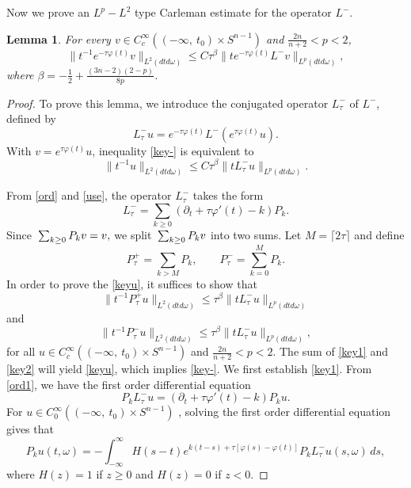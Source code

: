 \documentclass[11pt]{amsart}
\theoremstyle{plain}
\newtheorem{lemma}{Lemma}
\numberwithin{equation}{section}
\begin{document}
Now we prove an $L^p-L^2$ type Carleman estimate for the operator $L^-$.

\begin{lemma}
For every $v \in C^{\infty}_c{\left( {(-\infty, \ t_0)\times S^{n-1}} \right) }$ and $\frac{2n}{n+2}< p < 2$,
\begin{equation}
\|t^{-{1}} e^{-\tau \varphi(t)} v\|_{L^2(dtd\omega)} \leq C
\tau^\beta \|t e^{-\tau \varphi(t)} L^- v\|_{L^p(dtd\omega)},
\label{key-}
\end{equation}
where ${\beta} = - \frac 1 2 + \frac{{\left( {3n-2} \right) }{\left( {2-p} \right) }}{8p}$.
\label{CarL-p}
\end{lemma}

\begin{proof}
To prove this lemma, we introduce the conjugated operator $L^-_\tau$ of $L^-$, defined by
$$L^-_\tau u=e^{-\tau\varphi(t)}L^-(e^{\tau \varphi(t)}u).$$
With $v=e^{\tau \varphi(t)}u$, inequality \eqref{key-} is equivalent to
\begin{equation}
\|t^{-{1}}u \|_{L^2(dtd\omega)}\leq C \tau^\beta \|t L^-_\tau
u\|_{L^p(dtd\omega)}. \label{keyu}
\end{equation}

From \eqref{ord} and \eqref{use}, the operator $L^-_\tau$ takes the form
\begin{equation}
L^-_\tau=\sum_{k\geq 0} (\partial_t+\tau \varphi'(t)-k)P_k.
\label{ord1}
\end{equation}
Since ${\displaystyle} \sum_{k\geq 0} P_k v= v,$ we split ${\displaystyle} \sum_{k \ge 0} P_k v$ into two sums.
Let $M=\lceil 2\tau\rceil$ and define
$$ P^+_\tau=\sum_{k> M}P_k, \quad \quad  P^-_\tau=\sum_{k=0}^{M}P_k.      $$
In order to prove the \eqref{keyu}, it suffices to show that
\begin{equation}
\| t^{-1} P^+_\tau {u} \|_{L^2(dtd\omega)} \leq \tau^{\beta}\|
t{L_\tau^- u} \|_{L^{{p}}(dtd\omega)}
\label{key1}
\end{equation}
and
\begin{equation}
\| t^{-1} P^-_\tau {u}\|_{L^2(dtd\omega)}\leq \tau^\beta\| t
{L_\tau^- u} \|_{L^{{p}}(dtd\omega)},
\label{key2}
\end{equation}
for all $u \in C^{\infty}_c{\left( {(-\infty, \ t_0)\times S^{n-1}} \right) }$ and $\frac{2n}{n+2}< p < 2$.
The sum of \eqref{key1} and \eqref{key2} will yield \eqref{keyu}, which implies \eqref{key-}.
We first establish \eqref{key1}.
From \eqref{ord1}, we have the first order differential equation
\begin{equation}
P_k L^-_\tau u= (\partial_t+\tau \varphi'(t)-k)P_k u.
\label{sord}
\end{equation}
For $u\in C^\infty_{0}{\left( { (-\infty, \ t_0)\times S^{n-1}} \right) }$
, solving the first order differential equation gives that
\begin{equation}
P_k u(t, \omega)
=-\int_{-\infty}^{\infty} H(s-t)e^{k(t-s)+\tau{\left[{\varphi(s)-\varphi(t)}\right]}} P_k L^-_\tau u (s, \omega)\, ds,
\label{star}
\end{equation}
where $H(z)=1$ if $z\geq 0$ and $H(z)=0$ if $z<0$.


\end{proof}
\end{document}
